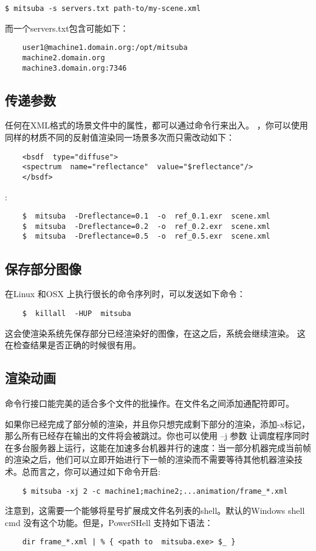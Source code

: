 \begin{lstlisting}
$ mitsuba -s servers.txt path-to/my-scene.xml
\end{lstlisting}
\par 而一个servers.txt包含可能如下：
\begin{lstlisting}
	user1@machine1.domain.org:/opt/mitsuba
	machine2.domain.org
	machine3.domain.org:7346
\end{lstlisting}

\subsection{传递参数}
\par 任何在XML格式的场景文件中的属性，都可以通过命令行来出入。
，你可以使用同样的材质不同的反射值渲染同一场景多次而只需改动如下：
\begin{lstlisting}
	<bsdf  type="diffuse">
	<spectrum  name="reflectance"  value="$reflectance"/>
	</bsdf>
\end{lstlisting}

:
\begin{lstlisting}
	$  mitsuba  -Dreflectance=0.1  -o  ref_0.1.exr  scene.xml
	$  mitsuba  -Dreflectance=0.2  -o  ref_0.2.exr  scene.xml
	$  mitsuba  -Dreflectance=0.5  -o  ref_0.5.exr  scene.xml
\end{lstlisting}

\subsection{保存部分图像}
在Linux 和OSX 上执行很长的命令序列时，可以发送如下命令：
\begin{lstlisting}
	$  killall  -HUP  mitsuba
\end{lstlisting}
\par 
这会使渲染系统先保存部分已经渲染好的图像，在这之后，系统会继续渲染。
这在检查结果是否正确的时候很有用。

\subsection{渲染动画}
命令行接口能完美的适合多个文件的批操作。在文件名之间添加通配符即可。
\par 
如果你已经完成了部分帧的渲染，并且你只想完成剩下部分的渲染，添加-x标记，那么所有已经存在输出的文件将会被跳过。你也可以使用 –j 参数 让调度程序同时在多台服务器上运行，这能在加速多台机器并行的速度：当一部分机器完成当前帧的渲染之后，他们可以立即开始进行下一帧的渲染而不需要等待其他机器渲染技术。总而言之，你可以通过如下命令开启:
\begin{lstlisting}
	$ mitsuba -xj 2 -c machine1;machine2;...animation/frame_*.xml
\end{lstlisting}
\par 
注意到，这需要一个能够将星号扩展成文件名列表的shell。默认的Windows shell cmd 没有这个功能。但是，PowerSHell 支持如下语法：
\begin{lstlisting}
	dir frame_*.xml | % { <path to  mitsuba.exe> $_ }
\end{lstlisting}


